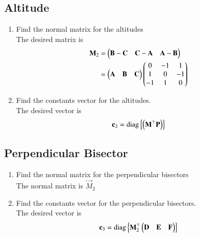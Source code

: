 		\subsection{Altitude}
\begin{enumerate}[label=\thesubsection.\arabic*.,ref=\thesubsection.\theenumi]
\item Find the normal matrix for the altitudes
	\\
		\solution  The desired matrix is 
\begin{align}
	\mathbf{M}_2 &= 	\begin{pmatrix}\mathbf{B}-\mathbf{C} & \mathbf{C}-\mathbf{A} & \mathbf{A}-\mathbf{B} \end{pmatrix}
	\\
	&= 
	\begin{pmatrix}\mathbf{A} & \mathbf{B} &\mathbf{C}\end{pmatrix}
			\begin{pmatrix} 0 & -1 & 1 \\ 1 & 0 & -1 \\ -1 & 1 & 0\end{pmatrix}
		\end{align}

	\item Find the constants vector for the altitudes.
		\\
		\solution The desired vector is 
		\begin{align}
			\mathbf{c}_2 = \text{diag}\left\{\left(\mathbf{M}^{\top}\mathbf{P}\right)\right\} 
		\end{align}
\end{enumerate}
		\subsection{Perpendicular Bisector}
\begin{enumerate}[label=\thesubsection.\arabic*.,ref=\thesubsection.\theenumi]
\item Find the normal matrix for the perpendicular bisectors
	\\
	\solution The normal matrix is $\vec{M}_2$
\item Find the constants vector for the perpendicular bisectors.
		\\
		\solution The desired vector is 
		\begin{align}
			\mathbf{c}_3 = \text{diag}\left\{\mathbf{M}_2^{\top}\begin{pmatrix}\mathbf{D} & \mathbf{E} &\mathbf{F}\end{pmatrix}\right\}
		\end{align}

\end{enumerate}
